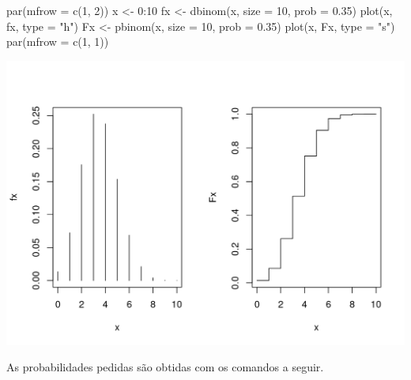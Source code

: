 \documentclass[
  10pt,
  a4paper]{book}
\newenvironment{Shaded}{\begin{snugshade}}{\end{snugshade}}
\newcommand{\AttributeTok}[1]{\textcolor[rgb]{0.77,0.63,0.00}{#1}}
\newcommand{\DecValTok}[1]{\textcolor[rgb]{0.00,0.00,0.81}{#1}}
\newcommand{\FloatTok}[1]{\textcolor[rgb]{0.00,0.00,0.81}{#1}}
\newcommand{\FunctionTok}[1]{\textcolor[rgb]{0.00,0.00,0.00}{#1}}
\newcommand{\NormalTok}[1]{#1}
\newcommand{\OtherTok}[1]{\textcolor[rgb]{0.56,0.35,0.01}{#1}}
\newcommand{\SpecialCharTok}[1]{\textcolor[rgb]{0.00,0.00,0.00}{#1}}
\newcommand{\StringTok}[1]{\textcolor[rgb]{0.31,0.60,0.02}{#1}}
\begin{document}
\begin{Shaded}
\begin{Highlighting}[]
\FunctionTok{par}\NormalTok{(}\AttributeTok{mfrow =} \FunctionTok{c}\NormalTok{(}\DecValTok{1}\NormalTok{, }\DecValTok{2}\NormalTok{))}
\NormalTok{x }\OtherTok{\textless{}{-}} \DecValTok{0}\SpecialCharTok{:}\DecValTok{10}
\NormalTok{fx }\OtherTok{\textless{}{-}} \FunctionTok{dbinom}\NormalTok{(x, }\AttributeTok{size =} \DecValTok{10}\NormalTok{, }\AttributeTok{prob =} \FloatTok{0.35}\NormalTok{)}
\FunctionTok{plot}\NormalTok{(x, fx, }\AttributeTok{type =} \StringTok{"h"}\NormalTok{)}
\NormalTok{Fx }\OtherTok{\textless{}{-}} \FunctionTok{pbinom}\NormalTok{(x, }\AttributeTok{size =} \DecValTok{10}\NormalTok{, }\AttributeTok{prob =} \FloatTok{0.35}\NormalTok{)}
\FunctionTok{plot}\NormalTok{(x, Fx, }\AttributeTok{type =} \StringTok{"s"}\NormalTok{)}
\FunctionTok{par}\NormalTok{(}\AttributeTok{mfrow =} \FunctionTok{c}\NormalTok{(}\DecValTok{1}\NormalTok{, }\DecValTok{1}\NormalTok{))}
\end{Highlighting}
\end{Shaded}

\begin{center}\includegraphics{figures/unnamed-chunk-349-1} \end{center}

As probabilidades pedidas são obtidas com os comandos a seguir.
\end{document}

